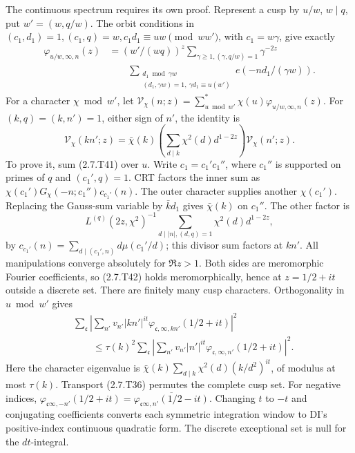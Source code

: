 The continuous spectrum requires its own proof. Represent a cusp by
$u/w$, $w\mid q$, put $w'=(w,q/w)$. The orbit conditions in
\cite[Lemma~3.6, (3.9)--(3.11)]{DI82}
$(c_1,d_1)=1,(c_1,q)=w,c_1d_1\equiv uw\pmod{ww'}$, with $c_1=w\gamma$,
give exactly
\[
\begin{aligned}
\varphi_{u/w,\infty,n}(z)&=
 (w'/(wq))^z
 \sum_{\gamma\ge1,(\gamma,q/w)=1}\gamma^{-2z}\\
&\qquad
 \sum_{\substack{d_1\bmod\gamma w\\(d_1,\gamma w)=1,\ \gamma d_1\equiv u(w')}}
                         e(-nd_1/(\gamma w)).
\end{aligned}
\tag{2.7.T41}\label{p1:eq:2.7.T41}
\]
For a character $\chi\bmod w'$, let
$\mathcal V_\chi(n;z)=\sum_{u\bmod w'}^*\chi(u)\varphi_{u/w,\infty,n}(z)$.
For $(k,q)=(k,n')=1$, either sign of $n'$, the identity is
\[
\mathcal V_\chi(kn';z)=\bar\chi(k)
          \left(\sum_{d\mid k}\chi^2(d)d^{1-2z}\right)\mathcal V_\chi(n';z).
\tag{2.7.T42}\label{p1:eq:2.7.T42}
\]
To prove it, sum (2.7.T41) over $u$. Write $c_1=c_1'c_1''$, where
$c_1''$ is supported on primes of $q$ and $(c_1',q)=1$.
CRT factors the inner sum as
$\chi(c_1')G_\chi(-n;c_1'')c_{c_1'}(n)$.
The outer character supplies another $\chi(c_1')$.
Replacing the Gauss-sum variable by $\bar kd_1$ gives
$\bar\chi(k)$ on $c_1''$. The other factor is
\[
L^{(q)}(2z,\chi^2)^{-1}
     \sum_{d\mid|n|,(d,q)=1}\chi^2(d)d^{1-2z},
\]
by $c_{c_1'}(n)=\sum_{d\mid(c_1',n)}d\mu(c_1'/d)$; this divisor sum
factors at $kn'$. All manipulations converge absolutely for
$\Re z>1$. Both sides are meromorphic Fourier coefficients,
so (2.7.T42) holds meromorphically, hence at $z=1/2+it$ outside
a discrete set. There are finitely many cusp characters.
Orthogonality in $u\bmod w'$ gives
\[
\begin{split}
&\sum_{\mathfrak c}\left|\sum_{n'}v_{n'}|kn'|^{it}
            \varphi_{\mathfrak c,\infty,kn'}(1/2+it)\right|^2\\
&\qquad\le\tau(k)^2\sum_{\mathfrak c}\left|\sum_{n'}v_{n'}|n'|^{it}
            \varphi_{\mathfrak c,\infty,n'}(1/2+it)\right|^2.
\end{split}
\tag{2.7.T43}\label{p1:eq:2.7.T43}
\]
Here the character eigenvalue is
$\bar\chi(k)\sum_{d\mid k}\chi^2(d)(k/d^2)^{it}$,
of modulus at most $\tau(k)$. Transport (2.7.T36) permutes the
complete cusp set. For negative indices,
$\varphi_{\mathfrak c\infty,-n'}(1/2+it)
=\overline{\varphi_{\mathfrak c\infty,n'}(1/2-it)}$.
Changing $t$ to $-t$ and conjugating coefficients converts
each symmetric integration window to DI's positive-index
continuous quadratic form. The discrete exceptional set is null
for the $dt$-integral.

